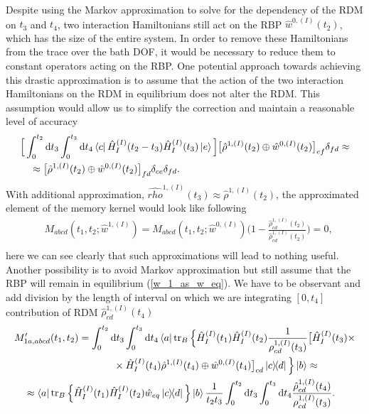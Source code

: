 Despite using the Markov approximation to solve for the dependency of the RDM on $t_3$ and $t_4$, two interaction Hamiltonians still act on the RBP $\hat{w}^{0, (I)}(t_2)$, which has the size of the entire system. In order to remove these Hamiltonians from the trace over the bath DOF, it would be necessary to reduce them to constant operators acting on the RBP. One potential approach towards achieving this drastic approximation is to assume that the action of the two interaction Hamiltonians on the RDM in equilibrium does not alter the RDM. This assumption would allow us to simplify the correction and maintain a reasonable level of accuracy
\begin{equation}
    \begin{aligned}
    &\Big[\int_{0}^{t_2} \mathrm{d} t_3 \int_{0}^{t_3} \mathrm{d} t_4 \bra{c}\hat{H}_{I}^{(I)}(t_2 - t_3) \hat{H}_{I}^{(I)}(t_3) \ket{e} \Big]\big[\hat{\rho}^{1, (I)}(t_2) \oplus \hat{w}^{0, (I)}(t_2)\big]_{ef} \delta_{fd} \approx \\
    &\quad \approx \big[\hat{\rho}^{1, (I)}(t_2) \oplus \hat{w}^{0, (I)}(t_2)\big]_{fd} \delta_{ce} \delta_{fd}.
    \end{aligned} 
\end{equation}
With additional approximation, $\hat{rho}^{1, (I)}(t_3) \approx \hat{\rho}^{1, (I)}(t_2)$, the approximated element of the memory kernel would look like following
\begin{equation}
\label{w_1_as_w_eq}
    \begin{aligned}
    &M_{abcd}(t_1, t_2; \hat{w}^{1,(I)}) = M_{abcd}(t_1, t_2; \hat{w}^{0,(I)}) \Big( 1 - \frac{\hat{\rho}_{cd}^{1, (I)}(t_2)}{\hat{\rho}_{cd}^{1, (I)}(t_2)}\Big) = 0,\\
    \end{aligned}
\end{equation}
here we can see clearly that such approximations will lead to nothing useful. Another possibility is to avoid Markov approximation but still assume that the RBP will remain in equilibrium (\ref{w_1_as_w_eq}). We have to be observant and add division by the length of interval on which we are integrating $[0, t_4]$ contribution of RDM $\hat{\rho}_{cd}^{1, (I)}(t_4)$
\begin{equation}
\label{w_1_as_w_eq_weighted}
    \begin{aligned}
    &M_{1a,abcd}^\prime(t_1, t_2) = \int_{0}^{t_2} \mathrm{d} t_3 \int_{0}^{t_3} \mathrm{d} t_4 \bra{a}\operatorname{tr}_B \Big\{ \hat{H}_{I}^{(I)}(t_1) \hat{H}_{I}^{(I)}(t_2) \frac{1}{\rho_{cd}^{1, (I)}(t_3)}\big[\hat{H}_{I}^{(I)}(t_3) \times \\
    & \quad \quad \quad \quad \quad \quad \quad \quad \quad \quad  \times\hat{H}_{I}^{(I)}(t_4) \hat{\rho}^{1, (I)}(t_4) \oplus \hat{w}^{0, (I)}(t_4)\big]_{cd} \ketbra{c}{d}\Big\} \ket{b} \approx \\
    & \quad \approx  \bra{a}\operatorname{tr}_B \Big\{ \hat{H}_{I}^{(I)}(t_1) \hat{H}_{I}^{(I)}(t_2)  \hat{w}_{eq}\ketbra{c}{d} \Big\} \ket{b} \frac{1}{t_2 t_3} \int_{0}^{t_2} \mathrm{d} t_3 \int_{0}^{t_3} \mathrm{d} t_4 \frac{\hat{\rho}_{cd}^{1, (I)}(t_4)}{\rho_{cd}^{1, (I)}(t_3)}.
    \end{aligned} 
\end{equation}

